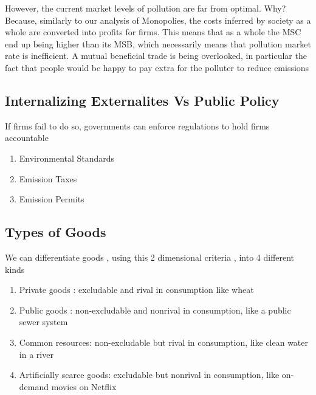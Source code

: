 \documentclass[english,course]{Notes}
\begin{document}
\par{However, the current market levels of pollution are far from optimal. Why? Because, similarly to our analysis of Monopolies, the costs inferred by society as a whole are converted into profits for firms. This means that as a whole the MSC end up being higher than its MSB, which necessarily means that pollution market rate is inefficient. A mutual beneficial trade is being overlooked, in particular the fact that people would be happy to pay extra for the polluter to reduce emissions}

\subsection{Internalizing Externalites Vs Public Policy}


\par{If firms fail to do so, governments can enforce regulations to hold firms accountable}


\begin{enumerate}
	\item Environmental Standards
	\item Emission Taxes
	\item Emission Permits
\end{enumerate}

\subsection{Types of Goods}



\par{We can differentiate goods , using this 2 dimensional criteria , into 4 different kinds}
\begin{enumerate}
	\item Private goods : excludable and rival in consumption like wheat
\item Public goods : non-excludable and nonrival in consumption, like a
public sewer system
\item Common resources: non-excludable but rival in consumption, like
clean water in a river
\item Artificially scarce goods: excludable but nonrival in consumption,
like on-demand movies on Netflix
\end{enumerate}
\end{document}
